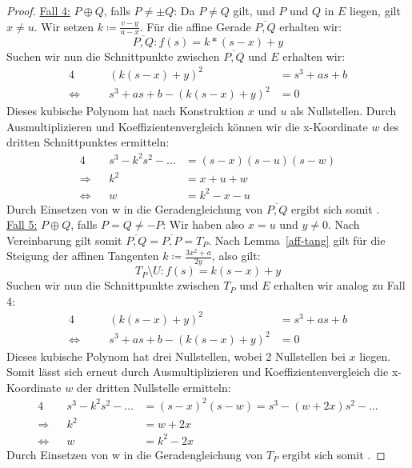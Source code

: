 \documentclass[hidelinks]{article}
\theoremstyle{plain}
\theoremstyle{definition}
\theoremstyle{rem}
\begin{document}
\begin{sloppypar}
\begin{proof}
    \underline{Fall 4:} $P\oplus Q$, falls $P\ne\pm Q$: Da $P\ne Q$ gilt, und $P$ und $Q$ in $E$ liegen, gilt $x\ne u$. Wir setzen $k\coloneqq\frac{v-y}{u-x}$. Für die affine Gerade $\overline{P,Q}$ erhalten wir:
    \begin{equation*}
        \overline{P,Q}:f(s)=k*(s-x)+y
    \end{equation*}
    Suchen wir nun die Schnittpunkte zwischen $\overline{P,Q}$ und $E$ erhalten wir:
    \begin{alignat*}{4}
        &&(k(s-x)+y)^2&=s^3+as+b\\
        \Leftrightarrow\quad&&s^3+as+b-(k(s-x)+y)^2&=0
    \end{alignat*}
    Dieses kubische Polynom hat nach Konstruktion $x$ und $u$ als Nullstellen. Durch Ausmultiplizieren und Koeffizientenvergleich können wir die x-Koordinate $w$ des dritten Schnittpunktes ermitteln:
    \begin{alignat*}{4}
        &&s^3-k^2s^2-\ldots&=(s-x)(s-u)(s-w)\\
        \Rightarrow&&k^2&=x+u+w\\
        \Leftrightarrow&&w&=k^2-x-u
    \end{alignat*}
    Durch Einsetzen von w in die Geradengleichung von $\overline{P,Q}$ ergibt sich somit .\\

    \underline{Fall 5:} $P\oplus Q$, falls $P=Q\ne-P$: Wir haben also $x=u$ und $y\ne 0$. Nach Vereinbarung gilt somit $\overline{P,Q}=\overline{P,P}=T_P$. Nach Lemma~\ref{aff-tang} gilt für die Steigung der affinen Tangenten $k\coloneqq\frac{3x^2+a}{2y}$, also gilt:
    \begin{equation*}
        T_P\setminus U:f(s)=k(s-x)+y
    \end{equation*}
    Suchen wir nun die Schnittpunkte zwischen $T_P$ und $E$ erhalten wir analog zu Fall 4:
    \begin{alignat*}{4}
        &&(k(s-x)+y)^2&=s^3+as+b\\
        \Leftrightarrow\quad&&s^3+as+b-(k(s-x)+y)^2&=0
    \end{alignat*}
    Dieses kubische Polynom hat drei Nullstellen, wobei 2 Nullstellen bei $x$ liegen. Somit lässt sich erneut durch Ausmultiplizieren und Koeffizientenvergleich die x-Koordinate $w$ der dritten Nullstelle ermitteln:
    \begin{alignat*}{4}
        &&s^3-k^2s^2-\ldots&=(s-x)^2(s-w)=s^3-(w+2x)s^2-\ldots\\
        \Rightarrow&&k^2&=w+2x\\
        \Leftrightarrow&&w&=k^2-2x
    \end{alignat*}
    Durch Einsetzen von w in die Geradengleichung von $T_P$ ergibt sich somit .
\end{proof}


\end{sloppypar}
\end{document}
